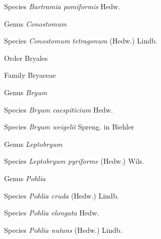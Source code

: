 \documentclass[9pt, article]{memoir}
\begin{document}
\begin{multicols}{2}
\vspace{6pt}\noindent\hspace{36pt}Species \textit{Bartramia pomiformis} Hedw.


\vspace{6pt}\noindent\hspace{30pt}Genus \textit{Conostomum}


\vspace{6pt}\noindent\hspace{36pt}Species \textit{Conostomum tetragonum} (Hedw.) Lindb.


\vspace{6pt}\noindent\hspace{18pt}Order Bryales


\vspace{6pt}\noindent\hspace{24pt}Family Bryaceae


\vspace{6pt}\noindent\hspace{30pt}Genus \textit{Bryum}


\vspace{6pt}\noindent\hspace{36pt}Species \textit{Bryum caespiticium} Hedw.


\vspace{6pt}\noindent\hspace{36pt}Species \textit{Bryum weigelii} Spreng. in Biehler


\vspace{6pt}\noindent\hspace{30pt}Genus \textit{Leptobryum}


\vspace{6pt}\noindent\hspace{36pt}Species \textit{Leptobryum pyriforme} (Hedw.) Wils.


\vspace{6pt}\noindent\hspace{30pt}Genus \textit{Pohlia}


\vspace{6pt}\noindent\hspace{36pt}Species \textit{Pohlia cruda} (Hedw.) Lindb.


\vspace{6pt}\noindent\hspace{36pt}Species \textit{Pohlia elongata} Hedw.


\vspace{6pt}\noindent\hspace{36pt}Species \textit{Pohlia nutans} (Hedw.) Lindb.



\end{multicols}
\end{document}
